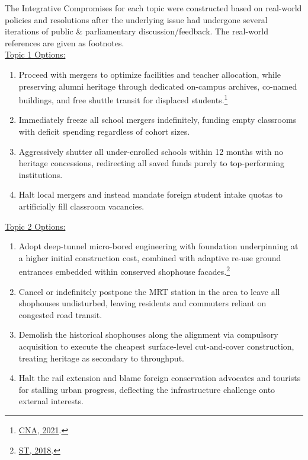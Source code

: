 \documentclass[titlepage]{article}
\begin{document}
The Integrative Compromises for each topic were constructed based on real-world policies and resolutions after the underlying issue had undergone several iterations of public \& parliamentary discussion/feedback. The real-world references are given as footnotes.\\

\underline{Topic 1 Options:}
\begin{enumerate}
    \item Proceed with mergers to optimize facilities and teacher allocation, while preserving alumni heritage through dedicated on-campus archives, co-named buildings, and free shuttle transit for displaced students.\footnote{\href{https://www.channelnewsasia.com/singapore/moe-school-merger-stamford-telok-kurau-pioneer-200791}{CNA, 2021}.}
    \item Immediately freeze all school mergers indefinitely, funding empty classrooms with deficit spending regardless of cohort sizes.
    \item Aggressively shutter all under-enrolled schools within 12 months with no heritage concessions, redirecting all saved funds purely to top-performing institutions.
    \item Halt local mergers and instead mandate foreign student intake quotas to artificially fill classroom vacancies.
\end{enumerate}

\underline{Topic 2 Options:}
\begin{enumerate}
    \item Adopt deep-tunnel micro-bored engineering with foundation underpinning at a higher initial construction cost, combined with adaptive re-use ground entrances embedded within conserved shophouse facades.\footnote{\href{https://www.straitstimes.com/singapore/bigger-portion-of-conserved-ellison-building-to-be-kept}{ST, 2018}.}
    \item Cancel or indefinitely postpone the MRT station in the area to leave all shophouses undisturbed, leaving residents and commuters reliant on congested road transit.
    \item Demolish the historical shophouses along the alignment via compulsory acquisition to execute the cheapest surface-level cut-and-cover construction, treating heritage as secondary to throughput.
    \item Halt the rail extension and blame foreign conservation advocates and tourists for stalling urban progress, deflecting the infrastructure challenge onto external interests.
\end{enumerate}
\end{document}
